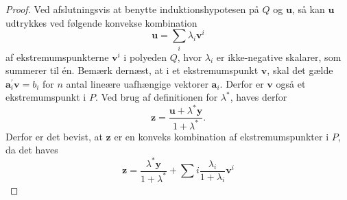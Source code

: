 \begin{proof}
Ved afslutningsvis at benytte induktionshypotesen på $Q$ og $\textbf{u}$, så kan $\textbf{u}$ udtrykkes ved følgende konvekse kombination
$$\textbf{u}=\sum_{i}\lambda_{i}\textbf{v}^i$$
af ekstremumspunkterne $\textbf{v}^i$ i polyeden $Q$, hvor $\lambda_i$ er ikke-negative skalarer, som summerer til én. Bemærk dernæst, at i et ekstremumspunkt $\textbf{v}$, skal det gælde $\mathbf{a}_{i}^{'} \textbf{v}=b_{i}$ for $n$ antal lineære uafhængige vektorer $\textbf{a}_i$. Derfor er  $\textbf{v}$ også et ekstremumspunkt i $P$. Ved brug af definitionen for $\lambda^*$, haves derfor 
$$ \textbf{z}=\frac{\textbf{u}+\lambda^*\textbf{y}}{1+\lambda^*}.$$
Derfor er det bevist, at $\textbf{z}$ er en konveks kombination af ekstremumspunkter i $P$, da det haves 
$$\textbf{z}=\frac{\lambda^*\textbf{y}}{1+\lambda^*}+\sum_{}i\frac{\lambda_i}{1+\lambda_i}\textbf{v}^i$$
\end{proof}
